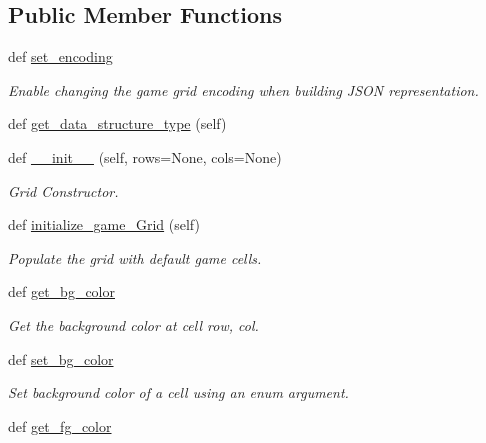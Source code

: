 \subsection*{Public Member Functions}
\begin{DoxyCompactItemize}
\item 
def \hyperlink{classbridges_1_1game__grid_1_1_game_grid_a6bf2b62c9a3cf8d3f852de3d086658bc}{set\+\_\+encoding}
\begin{DoxyCompactList}\small\item\em Enable changing the game grid encoding when building J\+S\+ON representation. \end{DoxyCompactList}\item 
def \hyperlink{classbridges_1_1game__grid_1_1_game_grid_a0a38f422a54e93cfd2816e0051fb8d5a}{get\+\_\+data\+\_\+structure\+\_\+type} (self)
\item 
def \hyperlink{classbridges_1_1game__grid_1_1_game_grid_a9f01ebe1e63708af7e8f1baab430a3cc}{\+\_\+\+\_\+init\+\_\+\+\_\+} (self, rows=None, cols=None)
\begin{DoxyCompactList}\small\item\em Grid Constructor. \end{DoxyCompactList}\item 
def \hyperlink{classbridges_1_1game__grid_1_1_game_grid_aefa77d94a0f5d43d029e5bb9856dd911}{initialize\+\_\+game\+\_\+\+Grid} (self)
\begin{DoxyCompactList}\small\item\em Populate the grid with default game cells. \end{DoxyCompactList}\item 
def \hyperlink{classbridges_1_1game__grid_1_1_game_grid_af99b99cdd5c487942ec15f5a5e5b208b}{get\+\_\+bg\+\_\+color}
\begin{DoxyCompactList}\small\item\em Get the background color at cell row, col. \end{DoxyCompactList}\item 
def \hyperlink{classbridges_1_1game__grid_1_1_game_grid_ab73bc9c4e6553629cad3b3244be50db9}{set\+\_\+bg\+\_\+color}
\begin{DoxyCompactList}\small\item\em Set background color of a cell using an enum argument. \end{DoxyCompactList}\item 
def \hyperlink{classbridges_1_1game__grid_1_1_game_grid_aefb99616dfc0f51601cebf6a420a965f}{get\+\_\+fg\+\_\+color}

\end{DoxyCompactItemize}
